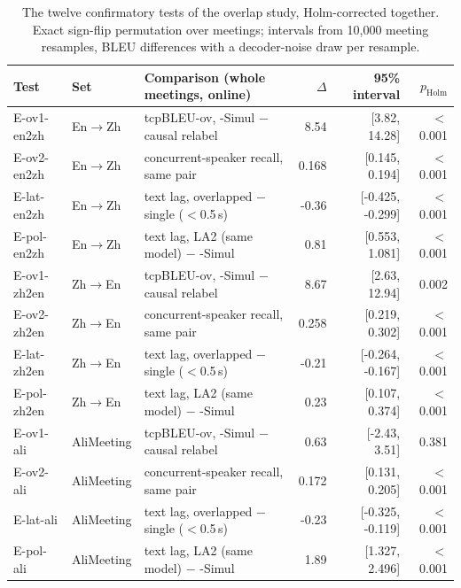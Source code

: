 \begin{table}[!t]
\centering\small
\setlength{\tabcolsep}{4pt}
\begin{tabular}{lllrrr}
\toprule
Test & Set & Comparison (whole meetings, online) & $\Delta$ & 95\% interval & $p_\text{Holm}$ \\
\midrule
E-ov1-en2zh & En$\rightarrow$Zh & tcpBLEU-ov, \sys{}-Simul $-$ causal relabel & 8.54 & [3.82, 14.28] & $<$0.001 \\
E-ov2-en2zh & En$\rightarrow$Zh & concurrent-speaker recall, same pair & 0.168 & [0.145, 0.194] & $<$0.001 \\
E-lat-en2zh & En$\rightarrow$Zh & text lag, overlapped $-$ single ($<$0.5\,s) & -0.36 & [-0.425, -0.299] & $<$0.001 \\
E-pol-en2zh & En$\rightarrow$Zh & text lag, LA2 (same model) $-$ \sys{}-Simul & 0.81 & [0.553, 1.081] & $<$0.001 \\
E-ov1-zh2en & Zh$\rightarrow$En & tcpBLEU-ov, \sys{}-Simul $-$ causal relabel & 8.67 & [2.63, 12.94] & 0.002 \\
E-ov2-zh2en & Zh$\rightarrow$En & concurrent-speaker recall, same pair & 0.258 & [0.219, 0.302] & $<$0.001 \\
E-lat-zh2en & Zh$\rightarrow$En & text lag, overlapped $-$ single ($<$0.5\,s) & -0.21 & [-0.264, -0.167] & $<$0.001 \\
E-pol-zh2en & Zh$\rightarrow$En & text lag, LA2 (same model) $-$ \sys{}-Simul & 0.23 & [0.107, 0.374] & $<$0.001 \\
E-ov1-ali & AliMeeting & tcpBLEU-ov, \sys{}-Simul $-$ causal relabel & 0.63 & [-2.43, 3.51] & 0.381 \\
E-ov2-ali & AliMeeting & concurrent-speaker recall, same pair & 0.172 & [0.131, 0.205] & $<$0.001 \\
E-lat-ali & AliMeeting & text lag, overlapped $-$ single ($<$0.5\,s) & -0.23 & [-0.325, -0.119] & $<$0.001 \\
E-pol-ali & AliMeeting & text lag, LA2 (same model) $-$ \sys{}-Simul & 1.89 & [1.327, 2.496] & $<$0.001 \\
\bottomrule
\end{tabular}
\caption{The twelve confirmatory tests of the overlap study, Holm-corrected together. Exact sign-flip permutation over meetings; intervals from
10,000 meeting resamples, BLEU differences with a decoder-noise draw per resample.}
\label{tab:reg8}
\end{table}
